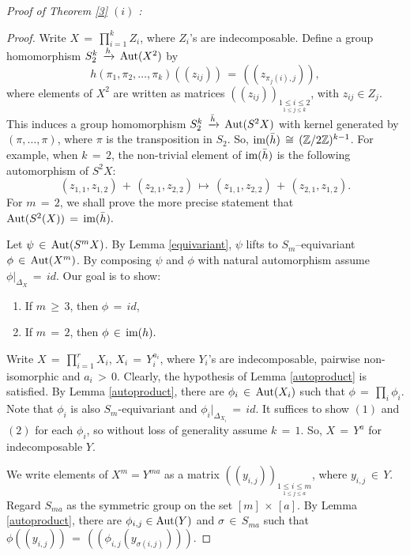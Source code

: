 \documentclass[12pt,reqno]{amsart}
\theoremstyle{definition}
\numberwithin{equation}{section}
\begin{document}
\textit{Proof of Theorem \ref{3} $(i)$ :}
\begin{proof}
 Write $X\,=\,\prod_{i=1}^k Z_i$, where $Z_i$'s are indecomposable. Define a group homomorphism $S_2^k\,\xrightarrow{h}\, \textnormal{Aut}(X^{2})$ by 
 $$ h(\pi_{1},\pi_{2},\ldots,\pi_{k})((z_{ij}))\,=\, ((z_{\pi_j(i),j} )),$$ 
 where elements of $X^{2}$ are written as matrices $ ((z_{ij}))_{\underset{1 \leq j \leq k}{1 \leq i \leq 2}}$, with $ z_{ij} \in Z_{j}.$ This induces a group homomorphism $S_2^k\,\xrightarrow{\Bar{h}}\, \textnormal{Aut}(S^2X)$ with kernel generated by $(\pi,\ldots,\pi)$, where $\pi$ is the transposition in $S_2$. So, $\textnormal{im}(\Bar{h})\,\cong\, (\mathbb{Z}/2\mathbb{Z})^{k-1}$. For example, when $k\,=\,2$, the non-trivial element of $\textnormal{im}(\Bar{h})$ is the following automorphism of $S^2X$:
\begin{equation}\label{swap}
    (z_{1,1}, z_{1,2})\,+\,(z_{2,1}, z_{2,2})\,\mapsto\, (z_{1,1}, z_{2,2}) \,+\, (z_{2,1}, z_{1,2}).
\end{equation} For $m\,=\,2$, we shall prove the more precise statement that $\textnormal{Aut}(S^{2}(X))\, = \,\textnormal{im}(\Bar{h}).$
 
Let $\psi\,\in\, \textnormal{Aut}(S^{m}X)$. By Lemma \ref{equivariant}, $\psi$ lifts to $S_m$--equivariant $ \phi \,\in\, \textnormal{Aut}(X^{m})$. By composing $\psi$ and $\phi$ with natural automorphism assume $\phi|_{\Delta_X}\,=\,id.$ Our goal is to show:
\begin{enumerate}
    \item If $m\,\geq\, 3$, then $\phi\,=\,id$,
    \item If $m\,=\,2$, then $\phi\,\in\, \textnormal{im}({h}).$
\end{enumerate}

Write $X\,=\,\prod_{i=1}^r X_i$, $X_i\,=\,Y_i^{a_i}$, where $Y_i$'s are indecomposable, pairwise non-isomorphic and $a_i\,>\,0$. Clearly, the hypothesis of Lemma \ref{autoproduct} is satisfied. By Lemma \ref{autoproduct}, there are $\phi_i\,\in\, \textnormal{Aut}(X_i)$ such that $\phi\,=\,\prod_i \phi_i.$ Note that $\phi_i$ is also $S_m$-equivariant and $\phi_i|_{\Delta_{X_i}}\,=\,id.$ It suffices to show $(1)$ and $(2)$ for each $\phi_i$, so without loss of generality assume $k\,=\,1.$ So, $X\,=\,Y^a$ for indecomposable $Y.$

We write elements of $X^m=Y^{ma}$ as a matrix $((y_{i,j}))_{\underset{1\leq j\leq a}{1\leq i \leq m} }$, where $y_{i,j}\,\in\, Y.$ Regard $S_{ma}$ as the symmetric group on the set $ [m]\, \times\, [a] .$ By Lemma \ref{autoproduct}, there are $\phi_{i,j}\in \textnormal{Aut}(Y) $ and $\sigma\,\in\, S_{ma}$ such that $\phi((y_{i,j}))\,=\,((\phi_{i,j}(y_{\sigma(i,j)})))$.


\end{proof}
\end{document}
